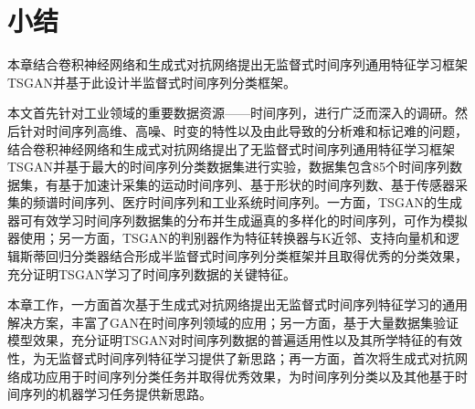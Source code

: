 


\section{小结}

本章结合卷积神经网络和生成式对抗网络提出无监督式时间序列通用特征学习框架TSGAN并基于此设计半监督式时间序列分类框架。

本文首先针对工业领域的重要数据资源——时间序列，进行广泛而深入的调研。然后针对时间序列高维、高噪、时变的特性以及由此导致的分析难和标记难的问题，结合卷积神经网络和生成式对抗网络提出了无监督式时间序列通用特征学习框架TSGAN并基于最大的时间序列分类数据集进行实验，数据集包含85个时间序列数据集，有基于加速计采集的运动时间序列、基于形状的时间序列数、基于传感器采集的频谱时间序列、医疗时间序列和工业系统时间序列。一方面，TSGAN的生成器可有效学习时间序列数据集的分布并生成逼真的多样化的时间序列，可作为模拟器使用；另一方面，TSGAN的判别器作为特征转换器与K近邻、支持向量机和逻辑斯蒂回归分类器结合形成半监督式时间序列分类框架并且取得优秀的分类效果，充分证明TSGAN学习了时间序列数据的关键特征。

本章工作，一方面首次基于生成式对抗网络提出无监督式时间序列特征学习的通用解决方案，丰富了GAN在时间序列领域的应用；另一方面，基于大量数据集验证模型效果，充分证明TSGAN对时间序列数据的普遍适用性以及其所学特征的有效性，为无监督式时间序列特征学习提供了新思路；再一方面，首次将生成式对抗网络成功应用于时间序列分类任务并取得优秀效果，为时间序列分类以及其他基于时间序列的机器学习任务提供新思路。

